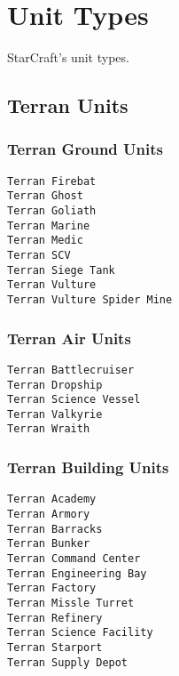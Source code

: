 \chapter{Unit Types}
\label{unittype}
StarCraft's unit types.

\section{Terran Units}

\subsection{Terran Ground Units}
\verb|Terran Firebat| \\
\verb|Terran Ghost| \\
\verb|Terran Goliath| \\
\verb|Terran Marine| \\
\verb|Terran Medic| \\
\verb|Terran SCV| \\
\verb|Terran Siege Tank| \\
\verb|Terran Vulture| \\
\verb|Terran Vulture Spider Mine|

\subsection{Terran Air Units}
\verb|Terran Battlecruiser| \\
\verb|Terran Dropship| \\
\verb|Terran Science Vessel| \\
\verb|Terran Valkyrie| \\
\verb|Terran Wraith|

\subsection{Terran Building Units}
\verb|Terran Academy| \\
\verb|Terran Armory| \\
\verb|Terran Barracks| \\
\verb|Terran Bunker| \\
\verb|Terran Command Center| \\
\verb|Terran Engineering Bay| \\
\verb|Terran Factory| \\
\verb|Terran Missle Turret| \\
\verb|Terran Refinery| \\
\verb|Terran Science Facility| \\
\verb|Terran Starport| \\
\verb|Terran Supply Depot|

